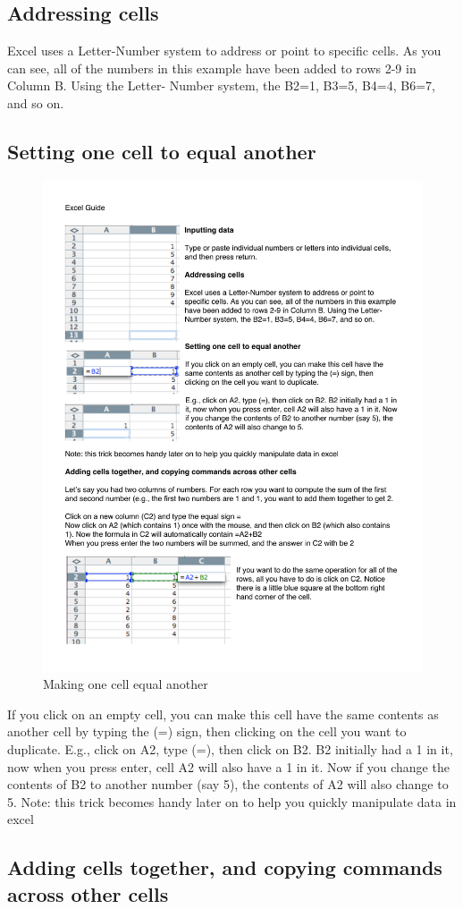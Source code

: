 \subsection{Addressing cells}

Excel uses a Letter-Number system to address or point to specific cells. As you can see, all of the numbers in this example have been added to rows 2-9 in Column B. Using the Letter- Number system, the B2=1, B3=5, B4=4, B6=7, and so on.


\subsection{Setting one cell to equal another}

\begin{figure}
      \includegraphics[width=.5\linewidth]{LabmanualFigures/Excel3.pdf}
      \caption{Making one cell equal another}
      \label{fig:excel3}
\end{figure}

If you click on an empty cell, you can make this cell have the same contents as another cell by typing the (=) sign, then clicking on the cell you want to duplicate.
E.g., click on A2, type (=), then click on B2. B2 initially had a 1 in it, now when you press enter, cell A2 will also have a 1 in it. Now if you change the contents of B2 to another number (say 5), the contents of A2 will also change to 5.
Note: this trick becomes handy later on to help you quickly manipulate data in excel

\subsection{Adding cells together, and copying commands across other cells}

